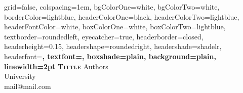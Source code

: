 \documentclass[portrait,final,a0paper,fontscale=0.32]{baposter}
\begin{document}

\begin{poster}%
  {
  grid=false,
  colspacing=1em,
  bgColorOne=white,
  bgColorTwo=white,
  borderColor=lightblue,
  headerColorOne=black,
  headerColorTwo=lightblue,
  headerFontColor=white,
  boxColorOne=white,
  boxColorTwo=lightblue,
  textborder=roundedleft,
  eyecatcher=true,
  headerborder=closed,
  headerheight=0.15\textheight,
  headershape=roundedright,
  headershade=shadelr,
  headerfont=\Large\bf\textsc, %
  textfont={\setlength{\parindent}{1.5em}},
  boxshade=plain,
  background=plain,
  linewidth=2pt
  }
  {}
  {\bf\textsc{Tittle}\vspace{0.5em}}
  {Authors\\
   University\\
    mail@mail.com}




\end{poster}
\end{document}
